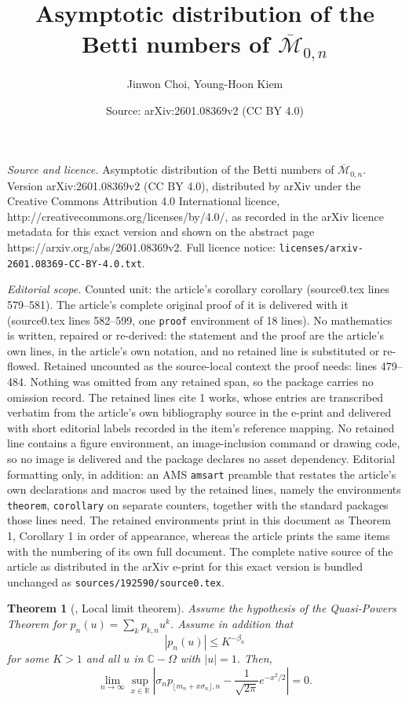 \documentclass[10pt,a4paper]{amsart}
\title{Asymptotic distribution of the Betti numbers of $\overline{\mathcal{M}}_{0,n}$}
\author{Jinwon Choi, Young-Hoon Kiem}
\date{Source: arXiv:2601.08369v2 (CC BY 4.0)}
\newtheorem{theorem}{Theorem}
\def\CC{\mathbb{C}}
\def\RR{\mathbb{R}}
\begin{document}
\maketitle

\noindent\emph{Source and licence.} Asymptotic distribution of the Betti numbers of $\overline{\mathcal{M}}_{0,n}$. Version arXiv:2601.08369v2 (CC BY 4.0), distributed by arXiv under the Creative Commons Attribution 4.0 International licence, http://creativecommons.org/licenses/by/4.0/, as recorded in the arXiv licence metadata for this exact version and shown on the abstract page https://arxiv.org/abs/2601.08369v2. Full licence notice: \texttt{licenses/arxiv-2601.08369-CC-BY-4.0.txt}.\par\smallskip

\noindent\textit{Editorial scope.} Counted unit: the article's corollary corollary (source0.tex lines 579--581). The article's complete original proof of it is delivered with it (source0.tex lines 582--599, one \texttt{proof} environment of 18 lines). No mathematics is written, repaired or re-derived: the statement and the proof are the article's own lines, in the article's own notation, and no retained line is substituted or re-flowed.  Retained uncounted as the source-local context the proof needs: lines 479--484.  Nothing was omitted from any retained span, so the package carries no omission record.  The retained lines cite 1 works, whose entries are transcribed verbatim from the article's own bibliography source in the e-print and delivered with short editorial labels recorded in the item's reference mapping.  No retained line contains a figure environment, an image-inclusion command or drawing code, so no image is delivered and the package declares no asset dependency.  Editorial formatting only, in addition: an AMS \texttt{amsart} preamble that restates the article's own declarations and macros used by the retained lines, namely the environments \texttt{theorem}, \texttt{corollary} on separate counters, together with the standard packages those lines need.  The retained environments print in this document as Theorem 1, Corollary 1 in order of appearance, whereas the article prints the same items with the numbering of its own full document.  The complete native source of the article as distributed in the arXiv e-print for this exact version is bundled unchanged as \texttt{sources/192590/source0.tex}.
\begin{theorem}[{\cite[Theorem IX.14]{FS}}, Local limit theorem] \label{thm:LLT}
    Assume the hypothesis of the Quasi-Powers Theorem for $p_n(u)=\sum_k p_{k,n}u^k$. Assume in addition that
    \[ |p_n(u)|\le K^{-\beta_n} \]
    for some $K>1$ and all $u$ in $\CC-\Omega$ with $|u|=1$.  Then,
    \[ \lim_{n\to \infty} \sup_{x\in \RR} \left| \sigma_n p_{\lfloor m_n +x\sigma_n \rfloor,n} - \frac{1}{\sqrt{2\pi}}e^{-x^2/2} \right| =0.\]
\end{theorem}
\end{document}
